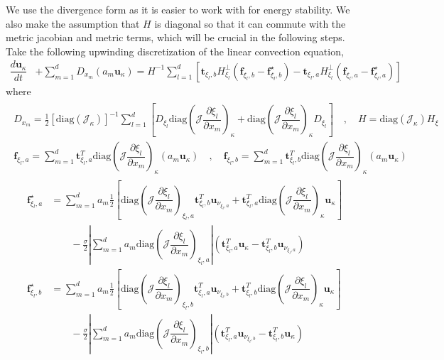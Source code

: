 \documentclass[12pt,a4paper]{article}
\newcommand{\pder}[2][]{\dfrac{\partial #1}{\partial #2}} %
\newcommand{\der}[2][]{\dfrac{d #1}{d #2}} %
\newcommand{\fn}[1]{\mathcal{#1}} %
\begin{document}
We use the divergence form as it is easier to work with for energy stability. We also make the assumption that $H$ is diagonal so that it can commute with the metric jacobian and metric terms, which will be crucial in the following steps. Take the following upwinding discretization of the linear convection equation,
\begin{align*}
\der[\bm{u}_\kappa]{t} &+ \sum_{m=1}^d D_{x_m} \left(  a_m \bm{u}_\kappa \right) = H^{-1} \sum_{l = 1}^d \left[  \bm{t}_{\xi_l,b} H^{\bot}_{\xi_l} \left(\bm{f}_{\xi_l,b} - \bm{f}^\star_{\xi_l,b} \right)  - \bm{t}_{\xi_l,a} H^{\bot}_{\xi_l} \left(\bm{f}_{\xi_l,a} - \bm{f}^\star_{\xi_l,a}  \right) \right]
\end{align*}
where
\begin{align*}
\begin{gathered}
D_{x_m} = \frac{1}{2} \left[ \text{diag}\left( \fn{J}_\kappa \right) \right]^{-1} \sum_{l=1}^d \left[ D_{\xi_l} \text{diag} \left( \fn{J} \pder[\xi_l]{x_m} \right)_\kappa + \text{diag} \left( \fn{J} \pder[\xi_l]{x_m} \right)_\kappa  D_{\xi_l} \right] \quad , \quad H = \text{diag} \left( \fn{J}_\kappa \right) H_\xi \\
\bm{f}_{\xi_l,a} =  \sum_{m=1}^d \bm{t}^T_{\xi_l,a} \text{diag} \left( \fn{J} \pder[\xi_l]{x_m} \right)_{\kappa} \left( a_m \bm{u}_{\kappa} \right) \quad , \quad \bm{f}_{\xi_l,b} = \sum_{m=1}^d \bm{t}^T_{\xi_l,b} \text{diag} \left( \fn{J} \pder[\xi_l]{x_m} \right)_{\kappa} \left( a_m \bm{u}_{\kappa} \right)
\end{gathered}
\end{align*} 
\vspace{-3mm}
\begin{align*}
\bm{f}^\star_{\xi_l,a} &=  \sum_{m=1}^d a_m \frac{1}{2} \left[ \text{diag} \left( \fn{J} \pder[\xi_l]{x_m} \right)_{\xi_l,a} \bm{t}^T_{\xi_l,b} \bm{u}_{\nu_{\xi_l,a}} + \bm{t}^T_{\xi_l,a} \text{diag} \left( \fn{J} \pder[\xi_l]{x_m} \right)_{\kappa} \bm{u}_{\kappa} \right] \\
&\qquad - \frac{\sigma}{2} \left\vert \sum_{m=1}^d a_m \text{diag} \left( \fn{J} \pder[\xi_l]{x_m} \right)_{\xi_l,a} \right\vert \left( \bm{t}^T_{\xi_l,a} \bm{u}_\kappa - \bm{t}^T_{\xi_l,b} \bm{u}_{\nu_{\xi_l,a}}  \right) \\
\bm{f}^\star_{\xi_l,b} &=  \sum_{m=1}^d a_m \frac{1}{2} \left[ \text{diag} \left( \fn{J} \pder[\xi_l]{x_m} \right)_{\xi_l,b} \bm{t}^T_{\xi_l,a} \bm{u}_{\nu_{\xi_l,b}} +  \bm{t}^T_{\xi_l,b} \text{diag} \left( \fn{J} \pder[\xi_l]{x_m} \right)_{\kappa} \bm{u}_{\kappa} \right] \\
&\qquad - \frac{\sigma}{2} \left\vert \sum_{m=1}^d a_m \text{diag} \left( \fn{J} \pder[\xi_l]{x_m} \right)_{\xi_l,b} \right\vert \left( \bm{t}^T_{\xi_l,a} \bm{u}_{\nu_{\xi_l,b}} - \bm{t}^T_{\xi_l,b} \bm{u}_\kappa   \right)
\end{align*}
\end{document}
